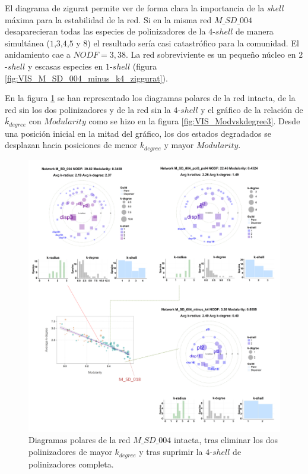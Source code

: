 El diagrama de zigurat permite ver de forma clara la importancia de la \textit{shell} máxima para la estabilidad de la red. Si en la misma red  $M\_SD\_004$ desaparecieran todas las especies de polinizadores de la $4$-$shell$ de manera simultánea ($1$,$3$,$4$,$5$ y $8$) el resultado sería casi catastrófico para la comunidad. El anidamiento cae a $NODF = 3,38$. La red sobreviviente es un pequeño núcleo en $2$-$shell$ y escasas especies en $1$-$shell$ (figura \ref{fig:VIS_M_SD_004_minus_k4_ziggurat}).

En la figura \ref{fig:VIS_Modvskdegree3-sd04} se han representado los diagramas polares de la red intacta, de la red sin los dos polinizadores y de la red sin la $4$-$shell$ y el gráfico de la relación de $\overline k_{degree}$ con $Modularity$ como se hizo en la figura \ref{fig:VIS_Modvskdegree3}. Desde una posición inicial en la mitad del gráfico, los dos estados degradados se desplazan hacia posiciones de menor $k_{degree}$ y mayor $Modularity$.

\begin{figure}[h!]
\centering
\includegraphics[scale=0.23]{Figures/VIS_Modvskdegree3-sd04.pdf}
\caption {Diagramas polares de la red $M\_SD\_004$ intacta, tras eliminar los dos polinizadores de mayor $k_{degree}$ y tras suprimir la $4$-$shell$ de polinizadores completa.} 
\label{fig:VIS_Modvskdegree3-sd04}
\end{figure}
 
